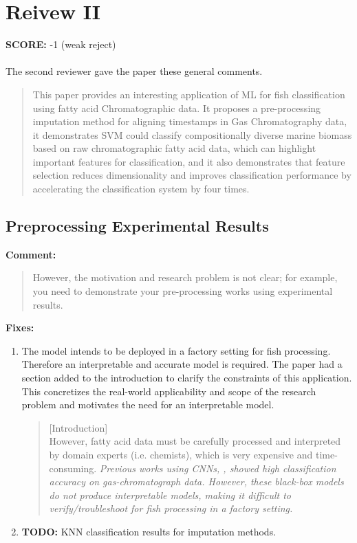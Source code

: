 \documentclass[runningheads]{llncs}
\begin{document}
\section{Reivew II}

\textbf{SCORE:} -1 (weak reject)
\\\\
The second reviewer gave the paper these general comments. 

\begin{quote}
  This paper provides an interesting application of ML for fish classification using fatty acid Chromatographic data. It proposes a pre-processing imputation method for aligning timestamps in Gas Chromatography data, it demonstrates SVM could classify compositionally diverse marine biomass based on raw chromatographic fatty acid data, which can highlight important features for classification, and it also demonstrates that feature selection reduces dimensionality and improves classification performance by accelerating the classification system by four times.
\end{quote}

\subsection{Preprocessing Experimental Results}

\textbf{Comment:}

\begin{quote}
  However, the motivation and research problem is not clear; 
  for example, you need to demonstrate your pre-processing works using experimental results. 
\end{quote}

\noindent\textbf{Fixes:}

\begin{enumerate}
  \item The model intends to be deployed in a factory setting for fish processing. Therefore an interpretable and accurate model is required. The paper had a section added to the introduction to clarify the constraints of this application. This concretizes the real-world applicability and scope of the research problem and motivates the need for an interpretable model. 
  \begin{quote}
    [Introduction] \\ 
    However, fatty acid data must be carefully processed and interpreted by domain experts (i.e. chemists), which is very expensive and time-consuming.
    \emph{Previous works using CNNs, \cite{bi2020gc,matyushin2020gas}, showed high classification accuracy on gas-chromatograph data. 
    However, these black-box models do not produce interpretable models, making it difficult to verify/troubleshoot for fish processing in a factory setting.}
  \end{quote}
  \item \textbf{TODO:} KNN classification results for imputation methods. 
\end{enumerate}
\end{document}
